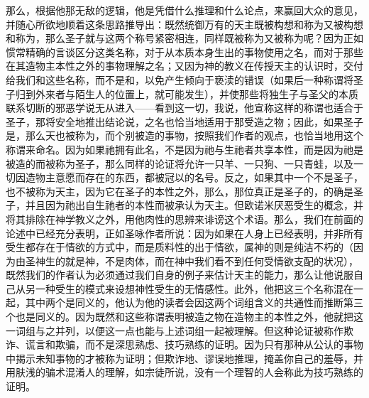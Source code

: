 那么，根据他那无敌的逻辑，他是凭借什么推理和什么论点，来赢回大众的意见，并随心所欲地顺着这条思路推导出：既然统御万有的天主既被构想和称为又被构想和称为，那么圣子就与这两个称号紧密相连，同样既被称为又被称为呢？因为正如惯常精确的言谈区分这类名称，对于从本质本身生出的事物使用之名，而对于那些在其造物主本性之外的事物理解之名；又因为神的教义在传授天主的认识时，交付给我们和这些名称，而不是和，以免产生倾向于亵渎的错误（如果后一种称谓将圣子归到外来者与陌生人的位置上，就可能发生），并使那些将独生子与圣父的本质联系切断的邪恶学说无从进入——看到这一切，我说，他宣称这样的称谓也适合于圣子，那将安全地推出结论说，之名也恰当地适用于那受造之物；因此，如果圣子是，那么天也被称为，而个别被造的事物，按照我们作者的观点，也恰当地用这个称谓来命名。因为如果祂拥有此名，不是因为祂与生祂者共享本性，而是因为祂是被造的而被称为圣子，那么同样的论证将允许一只羊、一只狗、一只青蛙，以及一切因造物主意愿而存在的东西，都被冠以的名号。反之，如果其中一个不是圣子，也不被称为天主，因为它在圣子的本性之外，那么，那位真正是圣子的，的确是圣子，并且因为祂出自生祂者的本性而被承认为天主。但欧诺米厌恶受生的概念，并将其排除在神学教义之外，用他肉性的思辨来诽谤这个术语。那么，我们在前面的论述中已经充分表明，正如圣咏作者所说：因为如果在人身上已经表明，并非所有受生都存在于情欲的方式中，而是质料性的出于情欲，属神的则是纯洁不朽的（因为由圣神生的就是神，不是肉体，而在神中我们看不到任何受情欲支配的状况），既然我们的作者认为必须通过我们自身的例子来估计天主的能力，那么让他说服自己从另一种受生的模式来设想神性受生的无情感性。此外，他把这三个名称混在一起，其中两个是同义的，他认为他的读者会因这两个词组含义的共通性而推断第三个也是同义的。因为既然和这些称谓表明被造之物在造物主的本性之外，他就把这一词组与之并列，以便这一点也能与上述词组一起被理解。但这种论证被称作欺诈、谎言和欺骗，而不是深思熟虑、技巧熟练的证明。因为只有那种从公认的事物中揭示未知事物的才被称为证明；但欺诈地、谬误地推理，掩盖你自己的羞辱，并用肤浅的骗术混淆人的理解，如宗徒所说，没有一个理智的人会称此为技巧熟练的证明。\par

